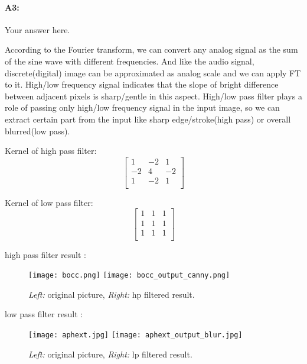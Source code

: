 	\paragraph{A3:} Your answer here.
	
	According to the Fourier transform, we can convert any analog signal as the sum of the sine wave with different frequencies.
 	And like the audio signal, discrete(digital) image can be approximated as analog scale and we can apply FT to it. 
	High/low frequency signal indicates that the slope of bright difference between adjacent pixels is sharp/gentle in this aspect.
	High/low pass filter plays a role of passing only high/low frequency signal in the input image, so we can extract certain part from the input like sharp edge/stroke(high pass) or overall blurred(low pass).

	Kernel of high pass filter:
	\[
	\begin{bmatrix}
	    1 & -2 & 1 \\
	    -2 & 4  & -2 \\
	    1 & -2 & 1 \\
	\end{bmatrix}
	\]
	
	Kernel of low pass filter:
	\[
	\begin{bmatrix}
	    1 & 1 & 1 \\
	    1 & 1 & 1 \\
	    1 & 1 & 1 \\
	\end{bmatrix}
	\]

	high pass filter result : 
	\begin{figure}[h!]
	    \centering
	    \texttt{[image: bocc.png]}
	    \texttt{[image: bocc\_output\_canny.png]}
	    \caption{\emph{Left:} original picture, \emph{Right:} hp filtered result.}
	    \label{fig:result2}
	\end{figure}
	
	low pass filter result : 
	\begin{figure}[h!]
	    \centering
	    \texttt{[image: aphext.jpg]}
	    \texttt{[image: aphext\_output\_blur.jpg]}
	    \caption{\emph{Left:} original picture, \emph{Right:} lp filtered result.}
	    \label{fig:result2}
	\end{figure}
	
	\pagebreak
